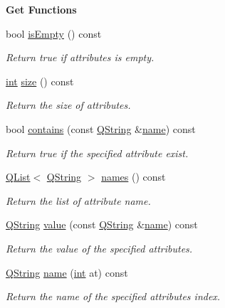 \begin{Indent}{\bf Get Functions}\par
\begin{DoxyCompactItemize}
\item 
bool \hyperlink{class_g_l_c___attributes_a49ff1e259f5af94a56b632962e909316}{is\-Empty} () const 
\begin{DoxyCompactList}\small\item\em Return true if attributes is empty. \end{DoxyCompactList}\item 
\hyperlink{ioapi_8h_a787fa3cf048117ba7123753c1e74fcd6}{int} \hyperlink{class_g_l_c___attributes_ac124fbba2685759b986934d662aa3b6a}{size} () const 
\begin{DoxyCompactList}\small\item\em Return the size of attributes. \end{DoxyCompactList}\item 
bool \hyperlink{class_g_l_c___attributes_ad6a3cc3a25b707fe052784c152ca8968}{contains} (const \hyperlink{group___u_a_v_objects_plugin_gab9d252f49c333c94a72f97ce3105a32d}{Q\-String} \&\hyperlink{glext_8h_ad977737dfc9a274a62741b9500c49a32}{name}) const 
\begin{DoxyCompactList}\small\item\em Return true if the specified attribute exist. \end{DoxyCompactList}\item 
\hyperlink{class_q_list}{Q\-List}$<$ \hyperlink{group___u_a_v_objects_plugin_gab9d252f49c333c94a72f97ce3105a32d}{Q\-String} $>$ \hyperlink{class_g_l_c___attributes_abf84d688b212550aa04df548289c4848}{names} () const 
\begin{DoxyCompactList}\small\item\em Return the list of attribute name. \end{DoxyCompactList}\item 
\hyperlink{group___u_a_v_objects_plugin_gab9d252f49c333c94a72f97ce3105a32d}{Q\-String} \hyperlink{class_g_l_c___attributes_a44206eda8a68d9d6db140b61c8703698}{value} (const \hyperlink{group___u_a_v_objects_plugin_gab9d252f49c333c94a72f97ce3105a32d}{Q\-String} \&\hyperlink{glext_8h_ad977737dfc9a274a62741b9500c49a32}{name}) const 
\begin{DoxyCompactList}\small\item\em Return the value of the specified attributes. \end{DoxyCompactList}\item 
\hyperlink{group___u_a_v_objects_plugin_gab9d252f49c333c94a72f97ce3105a32d}{Q\-String} \hyperlink{class_g_l_c___attributes_ada09a8fc3c23471b4a50d63f7b765d98}{name} (\hyperlink{ioapi_8h_a787fa3cf048117ba7123753c1e74fcd6}{int} at) const 
\begin{DoxyCompactList}\small\item\em Return the name of the specified attributes index. \end{DoxyCompactList}\end{DoxyCompactItemize}
\end{Indent}
